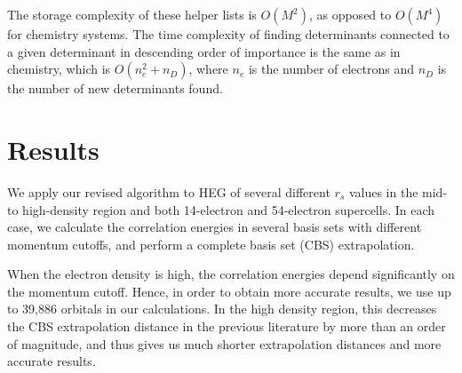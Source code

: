 The storage complexity of these helper lists is $O(M^2)$, as opposed to $O(M^4)$ for chemistry systems.
The time complexity of finding determinants connected to a given determinant in descending order of importance is the same as in chemistry, which is $O(n_e^2 + n_D)$, where $n_e$ is the number of electrons and $n_D$ is the number of new determinants found.

\section{Results}
\label{heg:results}
We apply our revised algorithm to HEG of several different $r_s$ values in the mid- to high-density region and both 14-electron and 54-electron supercells.
In each case, we calculate the correlation energies in several basis sets with different momentum cutoffs, and perform a complete basis set (CBS) extrapolation.

When the electron density is high, the correlation energies depend significantly on the momentum cutoff.
Hence, in order to obtain more accurate results, we use up to 39,886 orbitals in our calculations.
In the high density region, this decreases the CBS extrapolation distance in the previous literature by more than an order of magnitude, and thus gives us much shorter extrapolation distances and more accurate results.

